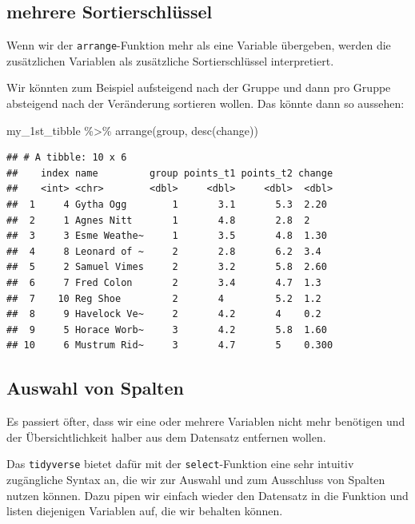 \documentclass[
]{book}
\newenvironment{Shaded}{\begin{snugshade}}{\end{snugshade}}
\newcommand{\FunctionTok}[1]{\textcolor[rgb]{0.00,0.00,0.00}{#1}}
\newcommand{\NormalTok}[1]{#1}
\newcommand{\SpecialCharTok}[1]{\textcolor[rgb]{0.00,0.00,0.00}{#1}}
\begin{document}
\hypertarget{mehrere-sortierschluxfcssel}{%
\subsection{mehrere Sortierschlüssel}\label{mehrere-sortierschluxfcssel}}

Wenn wir der \texttt{arrange}-Funktion mehr als eine Variable übergeben, werden die zusätzlichen Variablen als zusätzliche Sortierschlüssel interpretiert.

Wir könnten zum Beispiel aufsteigend nach der Gruppe und dann pro Gruppe absteigend nach der Veränderung sortieren wollen. Das könnte dann so aussehen:

\begin{Shaded}
\begin{Highlighting}[]
\NormalTok{my\_1st\_tibble }\SpecialCharTok{\%\textgreater{}\%} 
  \FunctionTok{arrange}\NormalTok{(group, }\FunctionTok{desc}\NormalTok{(change))}
\end{Highlighting}
\end{Shaded}

\begin{verbatim}
## # A tibble: 10 x 6
##    index name         group points_t1 points_t2 change
##    <int> <chr>        <dbl>     <dbl>     <dbl>  <dbl>
##  1     4 Gytha Ogg        1       3.1       5.3  2.20 
##  2     1 Agnes Nitt       1       4.8       2.8  2    
##  3     3 Esme Weathe~     1       3.5       4.8  1.30 
##  4     8 Leonard of ~     2       2.8       6.2  3.4  
##  5     2 Samuel Vimes     2       3.2       5.8  2.60 
##  6     7 Fred Colon       2       3.4       4.7  1.3  
##  7    10 Reg Shoe         2       4         5.2  1.2  
##  8     9 Havelock Ve~     2       4.2       4    0.2  
##  9     5 Horace Worb~     3       4.2       5.8  1.60 
## 10     6 Mustrum Rid~     3       4.7       5    0.300
\end{verbatim}

\hypertarget{auswahl-von-spalten}{%
\subsection{Auswahl von Spalten}\label{auswahl-von-spalten}}

Es passiert öfter, dass wir eine oder mehrere Variablen nicht mehr benötigen und der Übersichtlichkeit halber aus dem Datensatz entfernen wollen.

Das \texttt{tidyverse} bietet dafür mit der \texttt{select}-Funktion eine sehr intuitiv zugängliche Syntax an, die wir zur Auswahl und zum Ausschluss von Spalten nutzen können. Dazu pipen wir einfach wieder den Datensatz in die Funktion und listen diejenigen Variablen auf, die wir behalten können.
\end{document}
